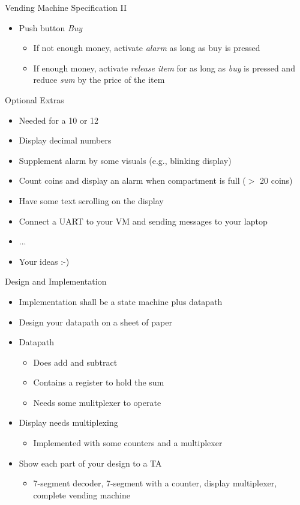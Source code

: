 \begin{frame}[fragile]{Vending Machine Specification II}
\begin{itemize}
\item Push button \emph{Buy}
\begin{itemize}
\item If not enough money, activate \emph{alarm} as long as buy is pressed
\item If enough money, activate \emph{release item} for as long as \emph{buy}
is pressed and reduce \emph{sum} by the price of the item
\end{itemize}
\end{itemize}
\end{frame}

\begin{frame}[fragile]{Optional Extras}
\begin{itemize}
\item Needed for a 10 or 12
\item Display decimal numbers
\item Supplement alarm by some visuals (e.g., blinking display)
\item Count coins and display an alarm when compartment is full ($>$ 20 coins)
\item Have some text scrolling on the display
\item Connect a UART to your VM and sending messages to your laptop
\item ...
\item Your ideas :-)
\end{itemize}
\end{frame}

\begin{frame}[fragile]{Design and Implementation}
\begin{itemize}
\item Implementation shall be a state machine plus datapath
\item Design your datapath on a sheet of paper
\item Datapath
\begin{itemize}
\item Does add and subtract
\item Contains a register to hold the sum
\item Needs some mulitplexer to operate
\end{itemize}
\item Display needs multiplexing
\begin{itemize}
\item Implemented with some counters and a multiplexer
\end{itemize}
\item Show each part of your design to a TA
\begin{itemize}
\item 7-segment decoder, 7-segment with a counter, display multiplexer, complete vending machine
\end{itemize}
\end{itemize}
\end{frame}

